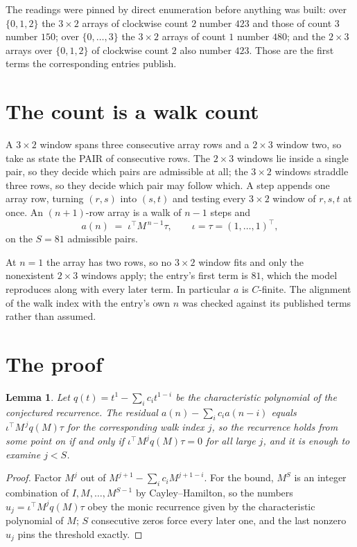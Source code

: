 \documentclass[11pt,a4paper]{article}
\theoremstyle{plain}
\newtheorem{lemma}[theorem]{Lemma}
\theoremstyle{definition}
\begin{document}
The readings were pinned by direct enumeration before anything was built: over
$\{0,1,2\}$ the $3\times2$ arrays of clockwise count $2$ number $423$ and those of count
$3$ number $150$; over $\{0,\dots,3\}$ the $3\times2$ arrays of count $1$ number $480$;
and the $2\times3$ arrays over $\{0,1,2\}$ of clockwise count $2$ also number $423$. Those
are the first terms the corresponding entries publish.

\section{The count is a walk count}

A $3\times2$ window spans three consecutive array rows and a $2\times3$
window two, so take as state the PAIR of consecutive rows. The $2\times3$ windows lie inside a
single pair, so they decide which pairs are admissible at all; the $3\times2$ windows straddle
three rows, so they decide which pair may follow which. A step appends one array row, turning
$(r,s)$ into $(s,t)$ and testing every $3\times2$ window of $r,s,t$ at once. An $(n+1)$-row
array is a walk of $n-1$ steps and
\[
a(n)\;=\;\iota^{\!\top}M^{\,n-1}\tau,\qquad\iota=\tau=(1,\dots,1)^{\!\top},
\]
on the $S=81$ admissible pairs.

At $n=1$ the array has two rows, so no $3\times2$ window fits and only the
nonexistent $2\times3$ windows apply; the entry's first term is
$81$, which the model reproduces along with every later term.
In particular $a$ is $C$-finite. The alignment of the walk index with the entry's own $n$ was
checked against its published terms rather than assumed.

\section{The proof}

\begin{lemma}\label{lem:crit}
Let $q(t)=t^{1}-\sum_i c_it^{1-i}$ be the characteristic polynomial of the
conjectured recurrence. The residual $a(n)-\sum_ic_ia(n-i)$ equals
$\iota^{\!\top}M^{\,j}q(M)\tau$ for the corresponding walk index $j$, so the recurrence
holds from some point on if and only if $\iota^{\!\top}M^{j}q(M)\tau=0$ for all large $j$,
and it is enough to examine $j<S$.
\end{lemma}

\begin{proof}
Factor $M^{j}$ out of $M^{j+1}-\sum_ic_iM^{j+1-i}$. For the bound, $M^{S}$
is an integer combination of $I,M,\dots,M^{S-1}$ by Cayley--Hamilton, so the numbers
$u_j=\iota^{\!\top}M^{j}q(M)\tau$ obey the monic recurrence given by the characteristic
polynomial of $M$; $S$ consecutive zeros force every later one, and the last nonzero $u_j$
pins the threshold exactly.
\end{proof}
\end{document}

